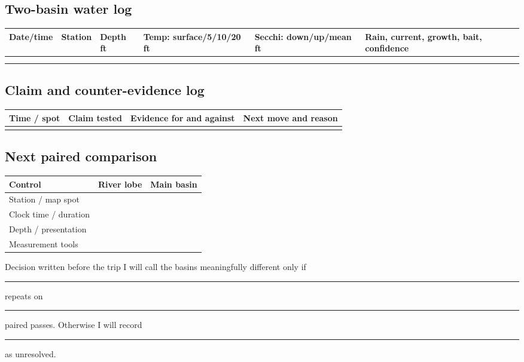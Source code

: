 \subsection{Two-basin water log}
\renewcommand{\arraystretch}{1.35}
\begin{tabularx}{\linewidth}{@{}p{.11\linewidth}p{.12\linewidth}p{.09\linewidth}
p{.15\linewidth}p{.15\linewidth}X@{}}
\toprule
Date/time & Station & Depth ft & Temp: surface/5/10/20 ft &
Secchi: down/up/mean ft & Rain, current, growth, bait, confidence\\
\midrule
\rule{0pt}{.8cm}&&&&&\\ \midrule
\rule{0pt}{.8cm}&&&&&\\
\bottomrule
\end{tabularx}
\renewcommand{\arraystretch}{1}

\subsection{Claim and counter-evidence log}
\begin{tabularx}{\linewidth}{@{}p{.13\linewidth}p{.18\linewidth}X X@{}}
\toprule
Time / spot & Claim tested & Evidence for and against & Next move and reason\\
\midrule
\rule{0pt}{.8cm}&&&\\
\bottomrule
\end{tabularx}

\subsection{Next paired comparison}
\begin{tabularx}{\linewidth}{@{}p{.22\linewidth}X X@{}}
\toprule
\textbf{Control} & \textbf{River lobe} & \textbf{Main basin}\\
\midrule
Station / map spot & \rule{0pt}{.7cm} &\\ \midrule
Clock time / duration & \rule{0pt}{.7cm} &\\ \midrule
Depth / presentation & \rule{0pt}{.7cm} &\\ \midrule
Measurement tools & \rule{0pt}{.7cm} &\\
\bottomrule
\end{tabularx}

\begin{teloscard}{Decision written before the trip}
I will call the basins meaningfully different only if
\rule{3.35in}{.4pt} repeats on \rule{.45in}{.4pt} paired passes. Otherwise I
will record \rule{2.5in}{.4pt} as unresolved.
\end{teloscard}


